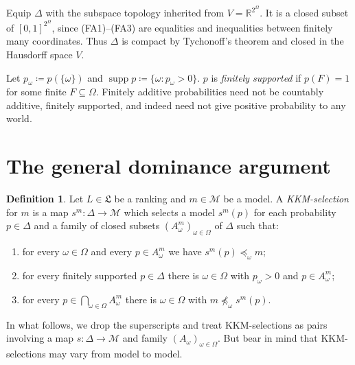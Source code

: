\documentclass[11pt]{article}
\newcommand{\chg}[1]{{\color{red}#1}}
\theoremstyle{definition}
\newtheorem{definition}[theorem]{Definition}
\theoremstyle{remark}
\newcommand{\M}{\mathcal M}
\newcommand{\supp}{\operatorname{supp}}
\begin{document}
\chg{Equip $\Delta$ with the subspace topology inherited from $V=\mathbb R^{2^\Omega}$. It is a closed subset of $[0,1]^{2^\Omega}$, since (FA1)--(FA3) are equalities and inequalities between finitely many coordinates. Thus $\Delta$ is compact by Tychonoff's theorem and closed in the Hausdorff space $V$.}

Let $p_\omega\coloneqq p(\{\omega\})$ and $\supp p\coloneqq\{\omega:p_\omega>0\}$.  $p$ is \emph{finitely supported} if $p(F)=1$ for some finite $F\subseteq\Omega$. Finitely additive probabilities need not be countably additive, finitely supported, and indeed need not give positive probability to any world.





\section{The general dominance argument}\label{sec:gen-dom}

\begin{definition}\label{def:selection}\label{def:selection-data}
Let $L\in\mathfrak L$ be a ranking and $m\in\M$ be a model. A \textit{KKM-selection} for $m$ is a map $s^m:\Delta\to\M$ which selects a model $s^m(p)$ for each probability $p\in\Delta$ and a family of closed subsets $(A^m_\omega)_{\omega\in\Omega}$ of $\Delta$ such that:
\begin{enumerate}[label=(S\arabic*),leftmargin=3em]
\item\label{S1} for every $\omega\in\Omega$ and every $p\in A^m_\omega$ we have $s^m(p)\preceq_\omega m$;
\item\label{S2} for every finitely supported $p\in\Delta$ there is $\omega\in\Omega$ with $p_\omega>0$ and $p\in A^m_\omega$;
\item\label{S3} for every $p\in\bigcap_{\omega\in\Omega}A^m_\omega$ there is $\omega\in\Omega$ with $m\not\preceq_\omega s^m(p)$.
\end{enumerate}
\end{definition}

In what follows, we drop the superscripts and treat KKM-selections as pairs involving a map $s:\Delta\to\M$ and family $(A_\omega)_{\omega\in\Omega}$. But bear in mind that KKM-selections may vary from model to model. 
\end{document}

